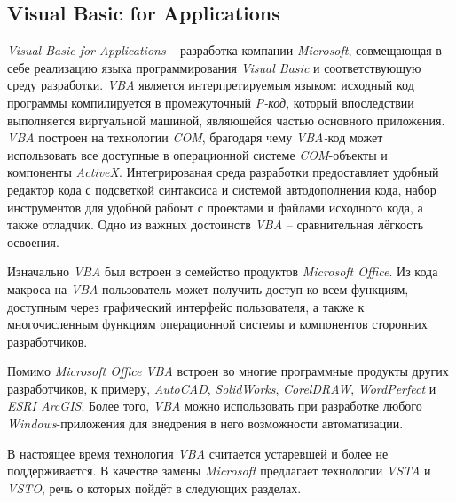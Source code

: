 \subsection{Visual Basic for Applications}

{\it Visual Basic for Applications} -- разработка компании {\it Microsoft}, совмещающая в себе реализацию языка программирования {\it Visual Basic} и соответствующую среду разработки. {\it VBA} является интерпретируемым языком: исходный код программы компилируется в промежуточный {\it P-код}, который впоследствии выполняется виртуальной машиной, являющейся частью основного приложения. {\it VBA} построен на технологии {\it COM}, брагодаря чему {\it VBA-}код может использовать все доступные в операционной системе {\it COM}-объекты и компоненты {\it ActiveX}. Интегрированая среда разработки предоставляет удобный редактор кода с подсветкой синтаксиса и системой автодополнения кода, набор инструментов для удобной рабоыт с проектами и файлами исходного кода, а также отладчик. Одно из важных достоинств {\it VBA} -- сравнительная лёгкость освоения.

Изначально {\it VBA} был встроен в семейство продуктов {\it Microsoft Office}. Из кода макроса на {\it VBA} пользователь может получить доступ ко всем функциям, доступным через графический интерфейс пользователя, а также к многочисленным функциям операционной системы и компонентов сторонних разработчиков.

Помимо {\it Microsoft Office} {\it VBA} встроен во многие программные продукты других разработчиков, к примеру,  {\it AutoCAD}, {\it SolidWorks}, {\it CorelDRAW}, {\it WordPerfect} и {\it ESRI ArcGIS}. Более того, {\it VBA} можно использовать при разработке любого {\it Windows}-приложения для внедрения в него возможности автоматизации. 

В настоящее время технология {\it VBA} считается устаревшей и более не поддерживается. В качестве замены {\it Microsoft} предлагает технологии {\it VSTA} и {\it VSTO}, речь о которых пойдёт в следующих разделах.